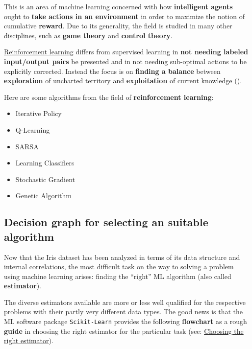 \documentclass [oneside,10pt,a4paper,ngerman,BCOR10mm,headsepline,parindent,final]{scrartcl}
\providecommand{\tightlist}{%
      \setlength{\itemsep}{0pt}\setlength{\parskip}{0pt}}
\begin{document}
This is an area of machine learning concerned with how
\textbf{intelligent agents} ought to \textbf{take actions in an
environment} in order to maximize the notion of cumulative
\textbf{reward}. Due to its generality, the field is studied in many
other disciplines, such as \textbf{game theory} and \textbf{control
theory}.

\href{https://en.wikipedia.org/wiki/Reinforcement_learning}{Reinforcement
learning} differs from supervised learning in \textbf{not needing
labeled input/output pairs} be presented and in not needing sub-optimal
actions to be explicitly corrected. Instead the focus is on
\textbf{finding a balance} between \textbf{exploration} of uncharted
territory and \textbf{exploitation} of current knowledge
(\cite{Wiki_Reinforcement_learning}).

Here are some algorithms from the field of \textbf{reinforcement
learning}:

\begin{itemize}
\tightlist
\item
  Iterative Policy
\item
  Q-Learning
\item
  SARSA
\item
  Learning Classifiers
\item
  Stochastic Gradient
\item
  Genetic Algorithm
\end{itemize}

    \hypertarget{decision-graph-for-selecting-an-suitable-algorithm}{%
\subsection{Decision graph for selecting an suitable
algorithm}\label{decision-graph-for-selecting-an-suitable-algorithm}}

Now that the Iris dataset has been analyzed in terms of its data
structure and internal correlations, the most difficult task on the way
to solving a problem using machine learning arises: finding the
``right'' ML algorithm (also called \textbf{estimator}).

The diverse estimators available are more or less well qualified for the
respective problems with their partly very different data types. The
good news is that the ML software package \texttt{Scikit-Learn} provides
the following \textbf{flowchart} as a rough \textbf{guide} in choosing
the right estimator for the particular task (see:
\href{https://scikit-learn.org/stable/tutorial/machine_learning_map/index.html}{Choosing
the right estimator}).
\end{document}
